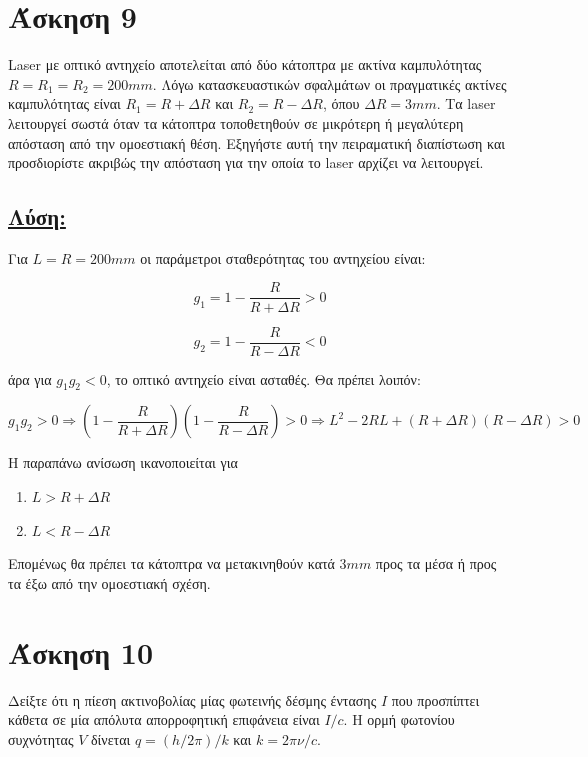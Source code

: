 \documentclass[a4paper,11pt,titlepage]{article}
\numberwithin{equation}{section} %
\begin{document}
\section{Άσκηση 9}

Laser με οπτικό αντηχείο αποτελείται από δύο κάτοπτρα με ακτίνα καμπυλότητας $R=R_1=R_2=200mm$. Λόγω κατασκευαστικών σφαλμάτων οι πραγματικές ακτίνες καμπυλότητας είναι $R_1=R+{\Delta}R$  και $R_2=R-{\Delta}R$, όπου ${\Delta}R=3mm$. Τα laser λειτουργεί σωστά όταν τα κάτοπτρα τοποθετηθούν σε μικρότερη ή μεγαλύτερη απόσταση από την ομοεστιακή θέση. Εξηγήστε αυτή την πειραματική διαπίστωση και προσδιορίστε ακριβώς την απόσταση για την οποία το laser αρχίζει να λειτουργεί.

\subsection*{\underline{Λύση:}}
Για $L=R=200mm$ οι παράμετροι σταθερότητας του αντηχείου είναι:


\begin{equation}
 g_1=1-\frac{R}{R+{\Delta}R}>0
\end{equation} 

 \begin{equation}
 g_2=1-\frac{R}{R-{\Delta}R}<0
\end{equation} 

άρα για $g_1g_2<0$, το οπτικό αντηχείο είναι ασταθές. Θα πρέπει λοιπόν:

\begin{equation}
 g_1g_2>0\Rightarrow(1-\frac{R}{R+{\Delta}R})(1-\frac{R}{R-{\Delta}R})>0\Rightarrow L^2-2RL+({R+{\Delta}R})({R-{\Delta}R})>0
\end{equation}

Η παραπάνω ανίσωση ικανοποιείται για 

\begin{enumerate}
 \item $L>R+\Delta R$
 \item $L<R-\Delta R$ 
\end{enumerate}


Επομένως θα πρέπει τα κάτοπτρα να μετακινηθούν κατά $3mm$ προς τα μέσα ή προς τα έξω από την ομοεστιακή σχέση.

\section{Άσκηση 10}

Δείξτε ότι η πίεση ακτινοβολίας μίας φωτεινής δέσμης έντασης $I$ που προσπίπτει κάθετα σε μία απόλυτα απορροφητική επιφάνεια είναι $I/c$. Η ορμή φωτονίου συχνότητας $V$ δίνεται $q=(h/2\pi)/k$ και $k=2\pi\nu/c$.
\end{document}
